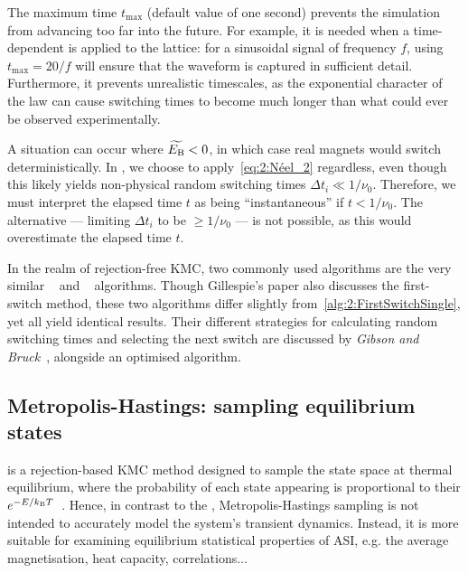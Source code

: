 The maximum time $t_\mathrm{max}$ (default value of one second) prevents the simulation from advancing too far into the future.
For example, it is needed when a time-dependent  is applied to the lattice: for a sinusoidal signal of frequency $f$, using $t_{\mathrm{max}}=20/f$ will ensure that the waveform is captured in sufficient detail.
Furthermore, it prevents unrealistic timescales, as the exponential character of the  law can cause switching times to become much longer than what could ever be observed experimentally. \par
A situation can occur where $\widetilde{E_\mathrm{B}} < 0$, in which case real magnets would switch deterministically.
In \hotspice, we choose to apply~\cref{eq:2:Néel_2} regardless, even though this likely yields non-physical random switching times $\Delta t_i \ll 1/\nu_0$.
Therefore, we must interpret the elapsed time $t$ as being ``instantaneous'' if $t < 1/\nu_0$.
The alternative --- limiting $\Delta t_i$ to be $\geq 1/\nu_0$ --- is not possible, as this would overestimate the elapsed time $t$. \par
In the realm of rejection-free KMC, two commonly used algorithms are the very similar ~\cite{nfoldMCalgorithm} and ~\cite{gillespie1976general} algorithms.
Though Gillespie's paper also discusses the first-switch method, these two algorithms differ slightly from~\cref{alg:2:FirstSwitchSingle}, yet all yield identical results.
Their different strategies for calculating random switching times and selecting the next switch are discussed by \textit{Gibson and Bruck}~\cite{GibsonBruck}, alongside an optimised algorithm.

\subsection{Metropolis-Hastings: sampling equilibrium states} \label{sec:2:Dynamics_MH}
 is a rejection-based KMC method designed to sample the state space at thermal equilibrium, where the probability of each state appearing is proportional to their  $e^{-E/\kBT}$~\cite{IntroductionMC,kyimba2006comparisonIsingAlgorithms}.
Hence, in contrast to the , Metropolis-Hastings sampling is not intended to accurately model the system's transient dynamics.
Instead, it is more suitable for examining equilibrium statistical properties of ASI, e.g. the average magnetisation, heat capacity, correlations...~\cite{ApparentFMpinwheel} \par

